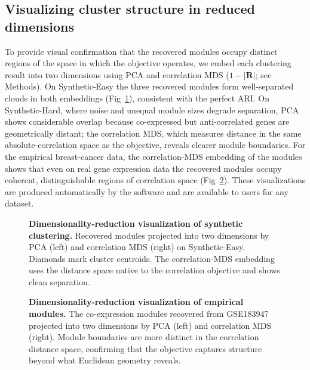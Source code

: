 \subsection*{Visualizing cluster structure in reduced dimensions}
To provide visual confirmation that the recovered modules occupy distinct regions
of the space in which the objective operates, we embed each clustering result
into two dimensions using PCA and correlation MDS
($1 - \lvert\mathbf{R}\rvert$; see Methods).  On Synthetic-Easy the three
recovered modules form well-separated clouds in both embeddings
(Fig~\ref{fig:dimred_synth}), consistent with the perfect ARI.  On
Synthetic-Hard, where noise and unequal module sizes degrade separation, PCA
shows considerable overlap because co-expressed but anti-correlated genes are
geometrically distant; the correlation MDS, which measures distance in the
same absolute-correlation space as the objective, reveals clearer module
boundaries.  For the empirical breast-cancer data, the correlation-MDS
embedding of the \EmpKmodules{} modules shows that even on real gene expression
data the recovered modules occupy coherent, distinguishable regions of
correlation space (Fig~\ref{fig:dimred_emp}).  These visualizations are produced
automatically by the software and are available to users for any dataset.

\begin{figure}[!h]
\caption{\textbf{Dimensionality-reduction visualization of synthetic
clustering.} Recovered modules projected into two dimensions by PCA (left) and
correlation MDS (right) on Synthetic-Easy.  Diamonds mark cluster centroids.
The correlation-MDS embedding uses the distance space native to the
correlation objective and shows clean separation.}
\label{fig:dimred_synth}
\end{figure}

\begin{figure}[!h]
\caption{\textbf{Dimensionality-reduction visualization of empirical modules.}
The \EmpKmodules{} co-expression modules recovered from GSE183947 projected into
two dimensions by PCA (left) and correlation MDS (right).  Module boundaries are
more distinct in the correlation distance space, confirming that the objective
captures structure beyond what Euclidean geometry reveals.}
\label{fig:dimred_emp}
\end{figure}

\clearpage
